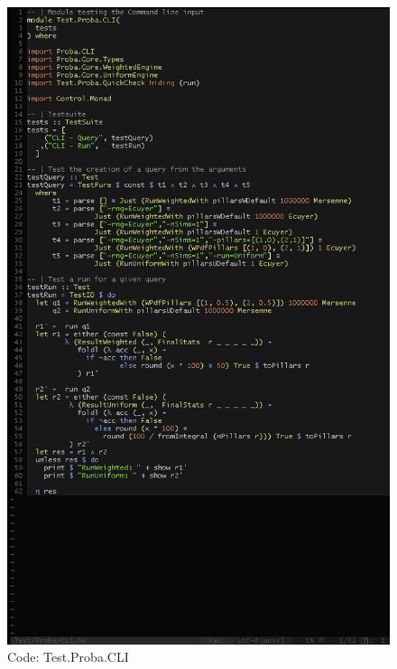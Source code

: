 \documentclass[12pt,a4paper,titlepage]{article}
\begin{document}
\begin{figure}[h!]
\centering
\includegraphics[width=1\textwidth]{img/code-test-cli.png}
\caption{Code: Test.Proba.CLI}
\label{fig:test.cli}
\end{figure}
\end{document}
